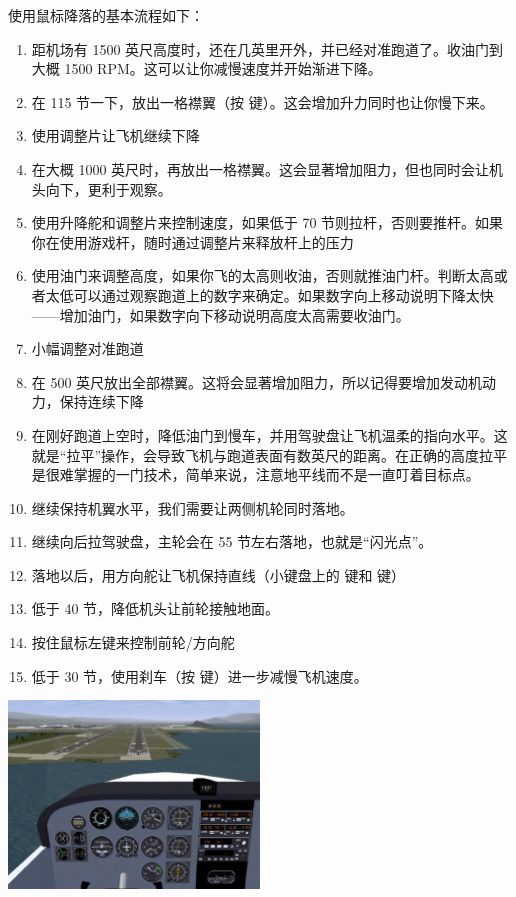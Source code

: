 使用鼠标降落的基本流程如下：
\begin{enumerate}
  \item  距机场有 1500 英尺高度时，还在几英里开外，并已经对准跑道了。收油门到大概 1500 RPM。这可以让你减慢速度并开始渐进下降。
  \item 在 115 节一下，放出一格襟翼（按 \key{]} 键）。这会增加升力同时也让你慢下来。
  \item 使用调整片让飞机继续下降
  \item 在大概 1000 英尺时，再放出一格襟翼。这会显著增加阻力，但也同时会让机头向下，更利于观察。
  \item 使用升降舵和调整片来控制速度，如果低于 70 节则拉杆，否则要推杆。如果你在使用游戏杆，随时通过调整片来释放杆上的压力
  \item 使用油门来调整高度，如果你飞的太高则收油，否则就推油门杆。判断太高或者太低可以通过观察跑道上的数字来确定。如果数字向上移动说明下降太快——增加油门，如果数字向下移动说明高度太高需要收油门。
  \item 小幅调整对准跑道
  \item 在 500 英尺放出全部襟翼。这将会显著增加阻力，所以记得要增加发动机动力，保持连续下降
  \item 在刚好跑道上空时，降低油门到慢车，并用驾驶盘让飞机温柔的指向水平。这就是“拉平”操作，会导致飞机与跑道表面有数英尺的距离。在正确的高度拉平是很难掌握的一门技术，简单来说，注意地平线而不是一直叮着目标点。
  \item 继续保持机翼水平，我们需要让两侧机轮同时落地。
  \item 继续向后拉驾驶盘，主轮会在 55 节左右落地，也就是“闪光点”。
  \item 落地以后，用方向舵让飞机保持直线（小键盘上的  键和  键）
  \item 低于 40 节，降低机头让前轮接触地面。
  \item 按住鼠标左键来控制前轮/方向舵
  \item 低于 30 节，使用刹车（按  键）进一步减慢飞机速度。
\end{enumerate}

\begin{center}
\includegraphics[width=0.5\textwidth]{img/tut_43}
\end{center}

